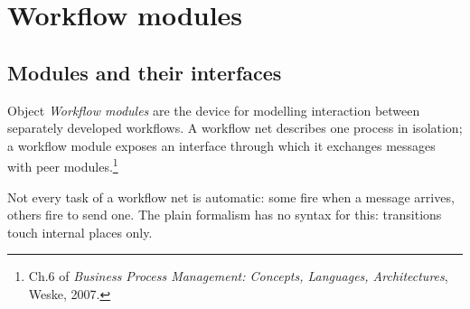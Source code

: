 \section{Workflow modules}

\subsection{Modules and their interfaces}

\begin{notebox}{Object}
\emph{Workflow modules} are the device for modelling interaction between separately developed workflows. A workflow net describes one process in isolation; a workflow module exposes an interface through which it exchanges messages with peer modules.\footnote{Ch.6 of \emph{Business Process Management: Concepts, Languages, Architectures}, Weske, 2007.}
\end{notebox}
Not every task of a workflow net is automatic: some fire when a message arrives, others fire to send one. The plain formalism has no syntax for this: transitions touch internal places only.

